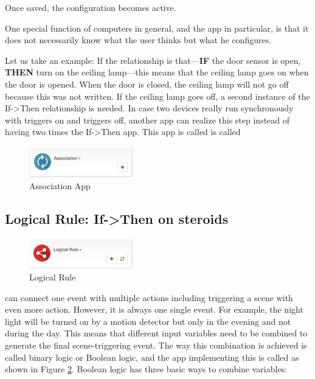 Once saved, the configuration becomes active.

One special function of computers in general, and the  app in particular, is that 
it does not necessarily know what the user thinks but what he configures.

Let us take an example: If the relationship is that---\textbf{IF} the door sensor is open, 
\textbf{THEN} turn on the ceiling lamp---this means that the ceiling lamp goes on when 
the door is opened. When the door is closed, the ceiling lamp will not go off because 
this was not written. If the ceiling lamp goes off, a second instance of the If->Then 
relationship is needed.
In case two devices really run synchronously with triggers on and triggers off, 
another app can realize this step instead of having two times the If->Then app. 
This app is called is called 


\begin{figure}
\begin{center}
\includegraphics[width=0.4\textwidth]{pngs/cap6/app12.png}
\caption{Association App}
\label{app12}
\end{center}
\end{figure}


\subsection{Logical Rule: If->Then on steroids}


\begin{figure}
\begin{center}
\includegraphics[width=0.4\textwidth]{pngs/cap6/app13.png}
\caption{Logical Rule}
\label{app13}
\end{center}
\end{figure}


 can connect one event with multiple actions including triggering a scene with 
even more action. However, it is always one single event. For example, the night light 
will be turned on by a motion detector but only in the evening and not during the day. 
This means that different input variables need to be combined to generate the final 
scene-triggering event. The way this combination is achieved is called binary logic or 
Boolean logic, and the app implementing this is called  as shown in 
Figure \ref{app13}. Boolean logic has three basic ways to combine variables:

